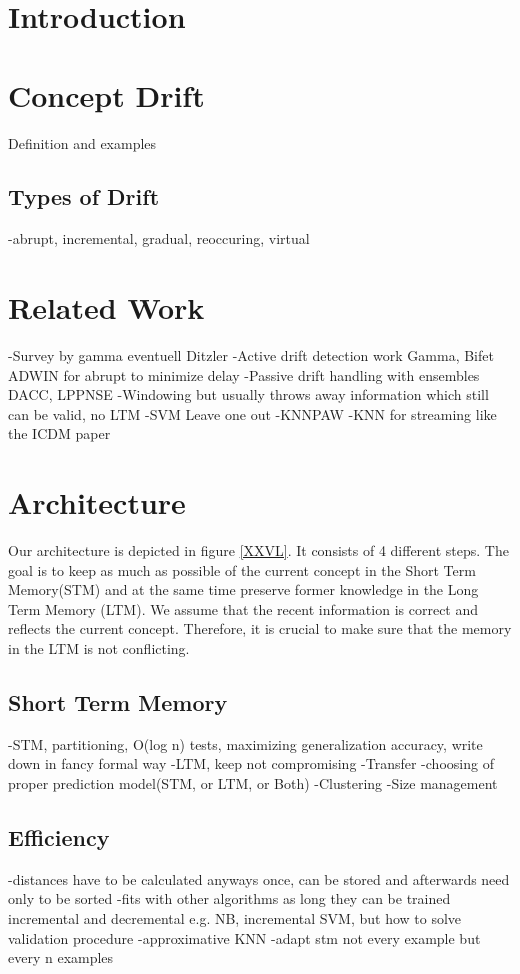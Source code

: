 \documentclass[conference]{IEEEtran}
\begin{document}
\IEEEpeerreviewmaketitle

\section{Introduction}
\section{Concept Drift}
Definition and examples
\subsection{Types of Drift}
-abrupt, incremental, gradual, reoccuring, virtual
\section{Related Work}
-Survey by gamma eventuell Ditzler
-Active drift detection work Gamma, Bifet ADWIN for abrupt to minimize delay
-Passive drift handling with ensembles DACC, LPPNSE
-Windowing but usually throws away information which still can be valid, no LTM
  -SVM Leave one out
  -KNNPAW 
-KNN for streaming like the ICDM paper


\section{Architecture}
Our architecture is depicted in figure \ref{XXVL}. It consists of 4 different steps. The goal is to keep as much as possible of the current concept in the Short Term Memory(STM) and at the same
time preserve former knowledge in the Long Term Memory (LTM). We assume that the recent information is correct and reflects the current concept. Therefore, it is crucial to make
sure that the memory in the LTM is not conflicting. 

\subsection{Short Term Memory}
-STM, partitioning, O(log n) tests, maximizing generalization accuracy, write down in fancy formal way
-LTM, keep not compromising
-Transfer
-choosing of proper prediction model(STM, or LTM, or Both)
-Clustering
-Size management

\subsection{Efficiency}
-distances have to be calculated anyways once, can be stored and afterwards need only to be sorted
-fits with other algorithms as long they can be trained incremental and decremental e.g. NB, incremental SVM, but how to solve validation procedure
-approximative KNN
-adapt stm not every example but every n examples
\end{document}
